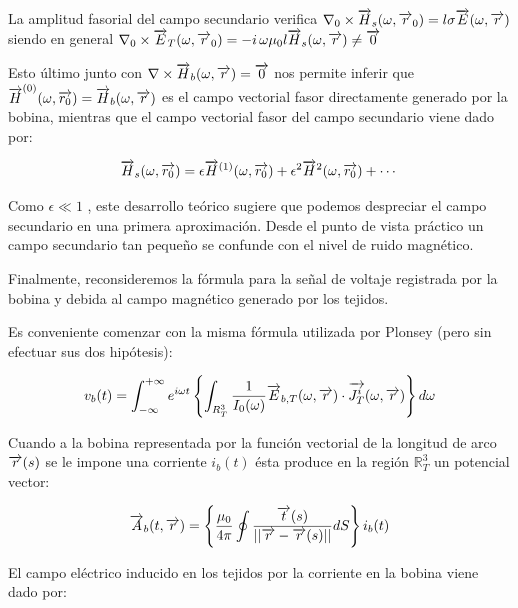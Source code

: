 \begin{sloppypar}

La amplitud fasorial del campo secundario verifica $\nabla_{0}\times\overrightarrow{H}_{s}(\omega, \overrightarrow{r}_{0})=l\sigma \overrightarrow{E}(\omega ,\overrightarrow{r})$ siendo en general $\nabla_{0}\times\overrightarrow{E}_{T}(\omega, \overrightarrow{r}_{0}) = - i \, \omega \mu_{0} l  \overrightarrow{H}_{s}(\omega,\overrightarrow{r}) \neq \overrightarrow{0}$

Esto último junto con ${\nabla \times \overrightarrow{H}_{b}(\omega,\overrightarrow{r}) = \overrightarrow{0}}$ nos permite inferir que ${{ \overrightarrow{H}}^{(0)}(\omega,\overrightarrow{r_{0}}) = \overrightarrow{H}_{b}(\omega,\overrightarrow{r})}$ es el campo vectorial fasor directamente generado por la bobina, mientras que el campo vectorial fasor del campo secundario viene dado por:

\end{sloppypar}

\begin{equation}
	\overrightarrow{H}_{s}(\omega,\overrightarrow{r_{0}})=\epsilon \overrightarrow{H}^{(1)}(\omega,\overrightarrow{r_{0}})+\epsilon^{2}\overrightarrow{H}^{2}(\omega,\overrightarrow{r_{0}})+ \cdots
\end{equation}

Como $\epsilon \ll 1$ , este desarrollo teórico sugiere que podemos despreciar el campo secundario en una primera aproximación. Desde el punto de vista práctico un campo secundario tan pequeño se confunde con el nivel de ruido magnético.

Finalmente, reconsideremos la fórmula para la señal de voltaje registrada por la bobina y debida al campo magnético generado por los tejidos.

Es conveniente comenzar con la misma fórmula utilizada por Plonsey (pero sin efectuar sus dos hipótesis):

\begin{equation}
	v_{b}(t)=\int_{-\infty}^{+\infty} e^{i\omega t}\left\lbrace  \int_{R^{3}_{T}} \dfrac{1}{I_{0}(\omega)} \overrightarrow{E}_{b,T}(\omega,\overrightarrow{r}) \cdot \overrightarrow{J_{T}^{i}}(\omega,\overrightarrow{r}) \right\rbrace d\omega
\end{equation}

Cuando a la bobina representada por la función vectorial de la longitud de arco $\overrightarrow{r}(s)$ se le impone una corriente $i_{b}(t)$ ésta produce en la región $\mathbb{R}^{3}_{T}$ un potencial vector:

\begin{equation}
	{\overrightarrow{A}}_{b}(t,\overrightarrow{r})=\left\lbrace    \dfrac{\mu_{0}}{4\pi} \oint \dfrac{\overrightarrow{t}(s)}{\vert\vert \overrightarrow{r}-\overrightarrow{r}(s) \vert\vert } dS       \right\rbrace  i_{b}(t)
\end{equation}

El campo eléctrico inducido en los tejidos por la corriente en la bobina viene dado por:

